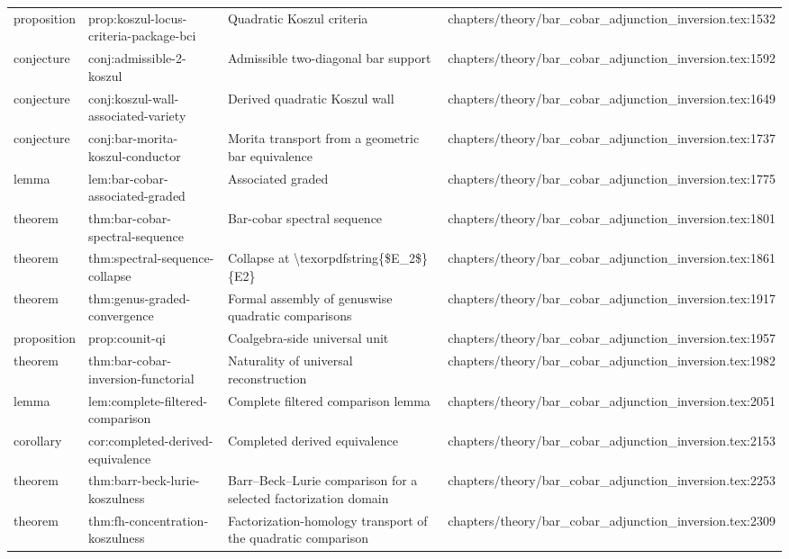 \documentclass[11pt]{article}
\begin{document}
\begin{longtable}{L{0.10\textwidth}L{0.26\textwidth}L{0.42\textwidth}L{0.22\textwidth}}
proposition & prop:koszul-locus-criteria-package-bci & Quadratic Koszul criteria & chapters/theory/bar\_cobar\_adjunction\_inversion.tex:1532\\
conjecture & conj:admissible-2-koszul & Admissible two-diagonal bar support & chapters/theory/bar\_cobar\_adjunction\_inversion.tex:1592\\
conjecture & conj:koszul-wall-associated-variety & Derived quadratic Koszul wall & chapters/theory/bar\_cobar\_adjunction\_inversion.tex:1649\\
conjecture & conj:bar-morita-koszul-conductor & Morita transport from a geometric bar equivalence & chapters/theory/bar\_cobar\_adjunction\_inversion.tex:1737\\
lemma & lem:bar-cobar-associated-graded & Associated graded & chapters/theory/bar\_cobar\_adjunction\_inversion.tex:1775\\
theorem & thm:bar-cobar-spectral-sequence & Bar-cobar spectral sequence & chapters/theory/bar\_cobar\_adjunction\_inversion.tex:1801\\
theorem & thm:spectral-sequence-collapse & Collapse at \textbackslash{}texorpdfstring\{\$E\_2\$\}\{E2\} & chapters/theory/bar\_cobar\_adjunction\_inversion.tex:1861\\
theorem & thm:genus-graded-convergence & Formal assembly of genuswise quadratic comparisons & chapters/theory/bar\_cobar\_adjunction\_inversion.tex:1917\\
proposition & prop:counit-qi & Coalgebra-side universal unit & chapters/theory/bar\_cobar\_adjunction\_inversion.tex:1957\\
theorem & thm:bar-cobar-inversion-functorial & Naturality of universal reconstruction & chapters/theory/bar\_cobar\_adjunction\_inversion.tex:1982\\
lemma & lem:complete-filtered-comparison & Complete filtered comparison lemma & chapters/theory/bar\_cobar\_adjunction\_inversion.tex:2051\\
corollary & cor:completed-derived-equivalence & Completed derived equivalence & chapters/theory/bar\_cobar\_adjunction\_inversion.tex:2153\\
theorem & thm:barr-beck-lurie-koszulness & Barr--Beck--Lurie comparison for a selected factorization domain & chapters/theory/bar\_cobar\_adjunction\_inversion.tex:2253\\
theorem & thm:fh-concentration-koszulness & Factorization-homology transport of the quadratic comparison & chapters/theory/bar\_cobar\_adjunction\_inversion.tex:2309\\

\end{longtable}
\end{document}
